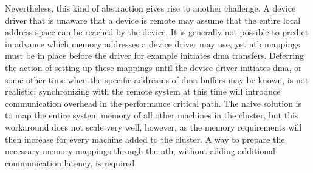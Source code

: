 Nevertheless, this kind of abstraction gives rise to another challenge. 
%
A device driver that is unaware that a device is remote may assume that the entire local address space can be reached by the device.
%
It is generally not possible to predict in advance which memory addresses a device driver may use, yet \gls{ntb} mappings must be in place before the driver for example initiates \gls{dma} transfers.
%
Deferring the action of setting up these mappings until the device driver initiates \gls{dma}, or some other time when the specific addresses of \gls{dma} buffers may be known, is not realistic;
%
synchronizing with the remote system at this time will introduce communication overhead in the performance critical path.
%
The naive solution is to map the entire system memory of all other machines in the cluster, but this workaround does not scale very well, however, as the memory requirements will then increase for every machine added to the cluster.
%
A way to prepare the necessary memory-mappings through the \gls{ntb}, without adding additional communication latency, is required.




